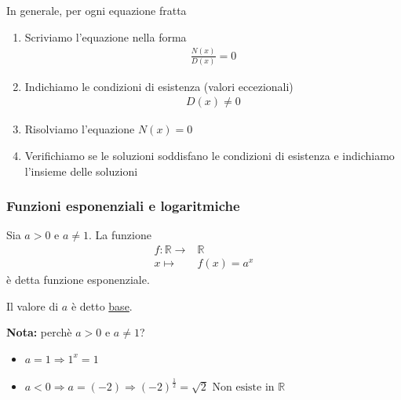 \documentclass[../main.tex]{subfiles}
\begin{document}
In generale, per ogni equazione fratta
\begin{enumerate}
    \item Scriviamo l'equazione nella forma \begin{align*}
        \frac{N(x)}{D(x)} = 0
    \end{align*}
    \item Indichiamo le condizioni di esistenza (valori eccezionali) \begin{align*}
        D(x) \neq 0
    \end{align*}
    \item Risolviamo l'equazione $N(x) = 0$
    \item Verifichiamo se le soluzioni soddisfano le condizioni di esistenza e indichiamo l'insieme delle soluzioni
\end{enumerate}

\pagebreak
\subsubsection{Funzioni esponenziali e logaritmiche}
Sia $a > 0$ e $a \neq 1$. La funzione
\begin{align*}
    f:\mathbb{R} \longrightarrow& \mathbb{R} \\
    x \longmapsto& f(x) = a^x
\end{align*}
è detta funzione esponenziale.

\vspace{1cm}
Il valore di $a$ è detto \underline{base}.

\textbf{Nota:} perchè $a>0$ e $a \neq 1$?
\begin{itemize}
    \item $a = 1 \Rightarrow 1^x = 1$
    \item $a < 0 \Rightarrow a = (-2) \Rightarrow (-2)^{\frac{1}{2}} = \sqrt{2} \text{ Non esiste in } \mathbb{R}$
\end{itemize}
\end{document}
